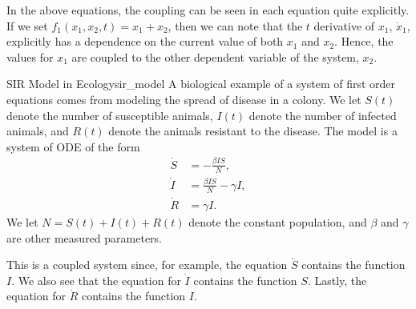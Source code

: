         In the above equations, the coupling can be seen in each equation quite explicitly. If we set $f_1(x_1,x_2,t)=x_1+x_2$, then we can note that the $t$ derivative of $x_1$, $\dot{x}_1$, explicitly has a dependence on the current value of both $x_1$ and $x_2$. Hence, the values for $x_1$ are coupled to the other dependent variable of the system, $x_2$.
        
        \begin{ex}{SIR Model in Ecology}{sir_model}
        A biological example of a system of first order equations comes from modeling the spread of disease in a colony.  We let $S(t)$ denote the number of susceptible animals, $I(t)$ denote the number of infected animals, and $R(t)$ denote the animals resistant to the disease.  The model is a system of ODE of the form
        \begin{align*}
            \dot{S} &= -\frac{\beta IS}{N},\\
            \dot{I} &= \frac{\beta I S}{N} - \gamma I,\\
            \dot{R} &= \gamma I.
        \end{align*}
        We let $N=S(t)+I(t)+R(t)$ denote the constant population, and $\beta$ and $\gamma$ are other measured parameters. 
        
        This is a coupled system since, for example, the equation $\dot{S}$ contains the function $I$.  We also see that the equation for $\dot{I}$ contains the function $S$.  Lastly, the equation for $\dot{R}$ contains the function $I$.  
        \end{ex}

